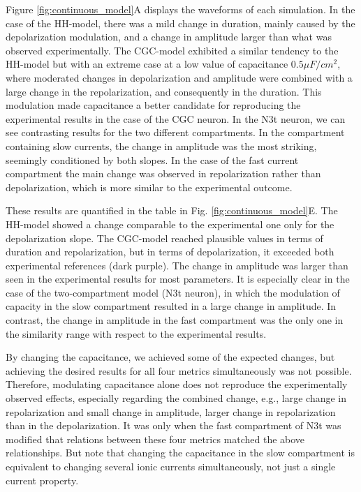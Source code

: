 Figure \ref{fig:continuous_model}A displays the waveforms of each simulation. In the case of the HH-model, there was a mild change in duration, mainly caused by the depolarization modulation, and a change in amplitude larger than what was observed experimentally. The CGC-model exhibited a similar tendency to the HH-model but with an extreme case at a low value of capacitance $0.5 \mu F/cm^2$, where moderated changes in depolarization and amplitude were combined with a large change in the repolarization, and consequently in the duration. This modulation made capacitance a better candidate for reproducing the experimental results in the case of the CGC neuron. In the N3t neuron, we can see contrasting results for the two different compartments. In the compartment containing slow currents, the change in amplitude was the most striking, seemingly conditioned by both slopes. In the case of the fast current compartment the main change was observed in repolarization rather than depolarization, which is more similar to the experimental outcome. 

These results are quantified in the table in Fig. \ref{fig:continuous_model}E. The HH-model showed a change comparable to the experimental one only for the depolarization slope. The CGC-model reached plausible values in terms of duration and repolarization, but in terms of depolarization, it exceeded both experimental references (dark purple). The change in amplitude was larger than seen in the experimental results for most parameters. It is especially clear in the case of the two-compartment model (N3t neuron), in which the modulation of capacity in the slow compartment resulted in a large change in amplitude. In contrast, the change in amplitude in the fast compartment was the only one in the similarity range with respect to the experimental results.

By changing the capacitance, we achieved some of the expected changes, but achieving the desired results for all four metrics simultaneously was not possible. Therefore, modulating capacitance alone does not reproduce the experimentally observed effects, especially regarding the combined change, e.g., large change in repolarization and small change in amplitude, larger change in repolarization than in the depolarization. It was only when the fast compartment of N3t was modified that relations between these four metrics matched the above relationships. But note that changing the capacitance in the slow compartment is equivalent to changing several ionic currents simultaneously, not just a single current property. 


